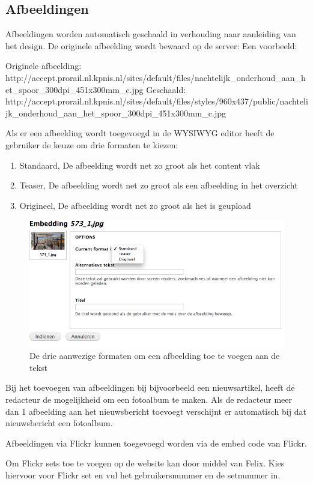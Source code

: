 \subsection{Afbeeldingen}

Afbeeldingen worden automatisch geschaald in verhouding naar aanleiding van het design. De originele afbeelding wordt bewaard op de server: Een voorbeeld:

Originele afbeelding: http://accept.prorail.nl.kpnis.nl/sites/default/files/nachtelijk\_onderhoud\_aan\_het\_spoor\_300dpi\_451x300mm\_c.jpg
Geschaald: http://accept.prorail.nl.kpnis.nl/sites/default/files/styles/960x437/public/nachtelijk\_onderhoud\_aan\_het\_spoor\_300dpi\_451x300mm\_c.jpg

Als er een afbeelding wordt toegevoegd in de WYSIWYG editor heeft de gebruiker de keuze om drie formaten te kiezen:

\begin{enumerate}
\item Standaard, De afbeelding wordt net zo groot als het content vlak
\item Teaser, De afbeelding wordt net zo groot als een afbeelding in het overzicht
\item Origineel, De afbeelding wordt net zo groot als het is geupload
\end{enumerate}

\begin{figure}[p]
\centering
\includegraphics[width=\textwidth]{img/wysiwyg_image.png}
\caption{De drie aanwezige formaten om een afbeelding toe te voegen aan de tekst}
\label{fig:felix_image}
\end{figure}

Bij het toevoegen van afbeeldingen bij bijvoorbeeld een nieuwsartikel, heeft de redacteur de mogelijkheid om een fotoalbum te maken. Als de redacteur meer dan 1 afbeelding aan het nieuwsbericht toevoegt verschijnt er automatisch bij dat nieuwsbericht een fotoalbum.

Afbeeldingen via Flickr kunnen toegevoegd worden via de embed code van Flickr.

Om Flickr sets toe te voegen op de website kan door middel van Felix. Kies hiervoor voor Flickr set en vul het gebruikersnummer en de setnummer in.